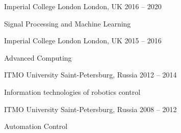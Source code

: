 

\begin{cventries}
            {Imperial College London} %
            {London, UK} %
            {2016 -- 2020} %
            {
                \begin{cvitems} %
                    \item {Signal Processing and Machine Learning}
                    \item {\lorem}
                \end{cvitems}
            }
            {Imperial College London} %
            {London, UK} %
            {2015 -- 2016} %
            {
                \begin{cvitems} %
                    \item {Advanced Computing}
                    \item {\lorem}
                \end{cvitems}
            }
            {ITMO University} %
            {Saint-Petersburg, Russia} %
            {2012 -- 2014} %
            {
                \begin{cvitems} %
                    \item {Information technologies of robotics control}
                    \item {\lorem}
                \end{cvitems}
            }
            {ITMO University} %
            {Saint-Petersburg, Russia} %
            {2008 -- 2012} %
            {
                \begin{cvitems} %
                    \item {Automation Control}
                    \item {\lorem}
                \end{cvitems}
            }
\end{cventries}
